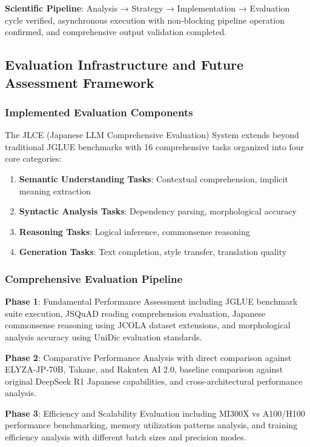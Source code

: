 \documentclass[11pt,a4paper]{article}
\begin{document}
\textbf{Scientific Pipeline}: Analysis → Strategy → Implementation → Evaluation cycle verified, asynchronous execution with non-blocking pipeline operation confirmed, and comprehensive output validation completed.

\subsection{Evaluation Infrastructure and Future Assessment Framework}

\subsubsection{Implemented Evaluation Components}

The JLCE (Japanese LLM Comprehensive Evaluation) System extends beyond traditional JGLUE benchmarks with 16 comprehensive tasks organized into four core categories:

\begin{enumerate}
\item \textbf{Semantic Understanding Tasks}: Contextual comprehension, implicit meaning extraction
\item \textbf{Syntactic Analysis Tasks}: Dependency parsing, morphological accuracy
\item \textbf{Reasoning Tasks}: Logical inference, commonsense reasoning
\item \textbf{Generation Tasks}: Text completion, style transfer, translation quality
\end{enumerate}

\subsubsection{Comprehensive Evaluation Pipeline}

\textbf{Phase 1}: Fundamental Performance Assessment including JGLUE benchmark suite execution, JSQuAD reading comprehension evaluation, Japanese commonsense reasoning using JCOLA dataset extensions, and morphological analysis accuracy using UniDic evaluation standards.

\textbf{Phase 2}: Comparative Performance Analysis with direct comparison against ELYZA-JP-70B, Takane, and Rakuten AI 2.0, baseline comparison against original DeepSeek R1 Japanese capabilities, and cross-architectural performance analysis.

\textbf{Phase 3}: Efficiency and Scalability Evaluation including MI300X vs A100/H100 performance benchmarking, memory utilization patterns analysis, and training efficiency analysis with different batch sizes and precision modes.
\end{document}
